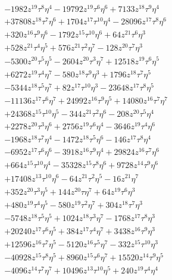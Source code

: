 {\begin{align*}
&-1982z^{19}\tau^{8}\eta^{4}-19792z^{19}\tau^{6}\eta^{6}+7133z^{18}\tau^{9}\eta^{4}\\
&+37808z^{18}\tau^{7}\eta^{6}+1704z^{17}\tau^{10}\eta^{4}-28096z^{17}\tau^{8}\eta^{6}\\
&+320z^{16}\tau^{9}\eta^{6}-1792z^{15}\tau^{10}\eta^{6}+64z^{21}\tau^{6}\eta^{3}\\
&+528z^{21}\tau^{4}\eta^{5}+576z^{21}\tau^{2}\eta^{7}-128z^{20}\tau^{7}\eta^{3}\\
&-5300z^{20}\tau^{5}\eta^{5}-2604z^{20}\tau^{3}\eta^{7}+12518z^{19}\tau^{6}\eta^{5}\\
&+6272z^{19}\tau^{4}\eta^{7}-580z^{18}\tau^{9}\eta^{3}+1796z^{18}\tau^{7}\eta^{5}\\
&-5344z^{18}\tau^{5}\eta^{7}+82z^{17}\tau^{10}\eta^{3}-23648z^{17}\tau^{8}\eta^{5}\\
&-11136z^{17}\tau^{6}\eta^{7}+24992z^{16}\tau^{9}\eta^{5}+14080z^{16}\tau^{7}\eta^{7}\\
&+24368z^{15}\tau^{10}\eta^{5}-344z^{21}\tau^{2}\eta^{6}-208z^{20}\tau^{5}\eta^{4}\\
&+2278z^{20}\tau^{3}\eta^{6}+2756z^{19}\tau^{6}\eta^{4}-3646z^{19}\tau^{4}\eta^{6}\\
&-1968z^{18}\tau^{7}\eta^{4}-1472z^{18}\tau^{5}\eta^{6}-146z^{17}\tau^{8}\eta^{4}\\
&-6952z^{17}\tau^{6}\eta^{6}-3918z^{16}\tau^{9}\eta^{4}+29824z^{16}\tau^{7}\eta^{6}\\
&+664z^{15}\tau^{10}\eta^{4}-35328z^{15}\tau^{8}\eta^{6}+9728z^{14}\tau^{9}\eta^{6}\\
&+17408z^{13}\tau^{10}\eta^{6}-64z^{21}\tau^{2}\eta^{5}-16z^{21}\eta^{7}\\
&+352z^{20}\tau^{3}\eta^{5}+144z^{20}\tau\eta^{7}+64z^{19}\tau^{6}\eta^{3}\\
&+480z^{19}\tau^{4}\eta^{5}-580z^{19}\tau^{2}\eta^{7}+304z^{18}\tau^{7}\eta^{3}\\
&-5748z^{18}\tau^{5}\eta^{5}+1024z^{18}\tau^{3}\eta^{7}-1768z^{17}\tau^{8}\eta^{3}\\
&+20240z^{17}\tau^{6}\eta^{5}+384z^{17}\tau^{4}\eta^{7}+3438z^{16}\tau^{9}\eta^{3}\\
&+12596z^{16}\tau^{7}\eta^{5}-5120z^{16}\tau^{5}\eta^{7}-332z^{15}\tau^{10}\eta^{3}\\
&-40928z^{15}\tau^{8}\eta^{5}+8960z^{15}\tau^{6}\eta^{7}+15520z^{14}\tau^{9}\eta^{5}\\
&-4096z^{14}\tau^{7}\eta^{7}+10496z^{13}\tau^{10}\eta^{5}+240z^{19}\tau^{4}\eta^{4}\\

\end{align*}}
